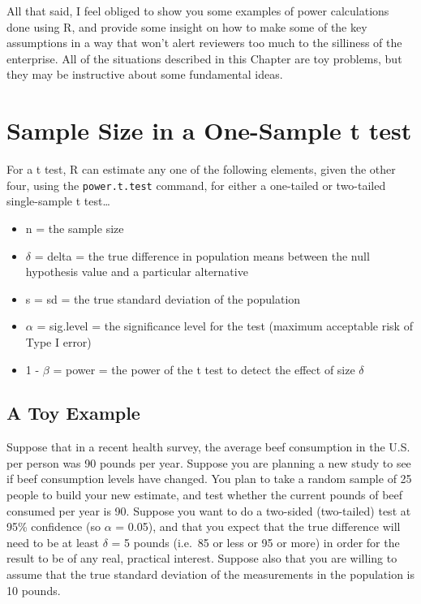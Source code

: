 \documentclass[
]{book}
\providecommand{\tightlist}{%
  \setlength{\itemsep}{0pt}\setlength{\parskip}{0pt}}
\begin{document}
All that said, I feel obliged to show you some examples of power calculations done using R, and provide some insight on how to make some of the key assumptions in a way that won't alert reviewers too much to the silliness of the enterprise. All of the situations described in this Chapter are toy problems, but they may be instructive about some fundamental ideas.

\hypertarget{sample-size-in-a-one-sample-t-test}{%
\section{Sample Size in a One-Sample t test}\label{sample-size-in-a-one-sample-t-test}}

For a t test, R can estimate any one of the following elements, given the other four, using the \texttt{power.t.test} command, for either a one-tailed or two-tailed single-sample t test\ldots{}

\begin{itemize}
\tightlist
\item
  n = the sample size
\item
  \(\delta\) = delta = the true difference in population means between the null hypothesis value and a particular alternative
\item
  s = sd = the true standard deviation of the population
\item
  \(\alpha\) = sig.level = the significance level for the test (maximum acceptable risk of Type I error)
\item
  1 - \(\beta\) = power = the power of the t test to detect the effect of size \(\delta\)
\end{itemize}

\hypertarget{a-toy-example}{%
\subsection{A Toy Example}\label{a-toy-example}}

Suppose that in a recent health survey, the average beef consumption in the U.S. per person was 90 pounds per year. Suppose you are planning a new study to see if beef consumption levels have changed. You plan to take a random sample of 25 people to build your new estimate, and test whether the current pounds of beef consumed per year is 90. Suppose you want to do a two-sided (two-tailed) test at 95\% confidence (so \(\alpha\) = 0.05), and that you expect that the true difference will need to be at least \(\delta\) = 5 pounds (i.e.~85 or less or 95 or more) in order for the result to be of any real, practical interest. Suppose also that you are willing to assume that the true standard deviation of the measurements in the population is 10 pounds.
\end{document}
